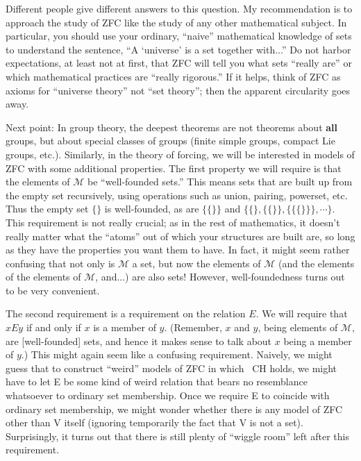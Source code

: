 \documentclass[10pt]{article}
\newcommand\axiom[1]{\textmd{#1}}
\begin{document}
Different people give different answers to this question. My recommendation is to approach the study of \axiom{ZFC} like the study of any other mathematical subject. In particular, you should use your ordinary, ``naive'' mathematical knowledge of sets to understand the sentence, ``A `universe' is a set together with...'' Do not harbor expectations, at least not at first, that \axiom{ZFC} will tell you what sets ``really are'' or which mathematical practices are ``really rigorous.'' If it helps, think of \axiom{ZFC} as axioms for ``universe theory'' not ``set theory''; then the apparent circularity goes away.

Next point: In group theory, the deepest theorems are not theorems about \textbf{all} groups, but about special classes of groups (finite simple groups, compact Lie groups, etc.). Similarly, in the theory of forcing, we will be interested in models of \axiom{ZFC} with some additional properties. The first property we will require is that the elements of $\mathcal{M}$ be ``well-founded sets.'' This means sets that are built up from the empty set recursively, using operations such as union, pairing, powerset, etc. Thus the empty set $\{\}$ is well-founded, as are $\{\{\}\}$ and $\{\{\}, \{\{\}\}, \{\{\{\}\}\}, \cdots\}$. This requirement is not really crucial; as in the rest of mathematics, it doesn't really matter what the ``atoms'' out of which your structures are built are, so long as they have the properties you want them to have. In fact, it might seem rather confusing that not only is $\mathcal{M}$ a set, but now the elements of $\mathcal{M}$ (and the elements of the elements of $\mathcal M$, and...) are also sets! However, well-foundedness turns out to be very convenient.

The second requirement is a requirement on the relation $E$. We will require that $x E y$ if and only if $x$ is a member of $y$. (Remember, $x$ and $y$, being elements of $\mathcal M$, are [well-founded] sets, and hence it makes sense to talk about $x$ being a member of $y$.) This might again seem like a confusing requirement. Naively, we might guess that to construct ``weird'' models of \axiom{ZFC} in which \axiom{~CH} holds, we might have to let E be some kind of weird relation that bears no resemblance whatsoever to ordinary set membership. Once we require E to coincide with ordinary set membership, we might wonder whether there is any model of \axiom{ZFC} other than V itself (ignoring temporarily the fact that V is not a set). Surprisingly, it turns out that there is still plenty of ``wiggle room'' left after this requirement.
\end{document}
